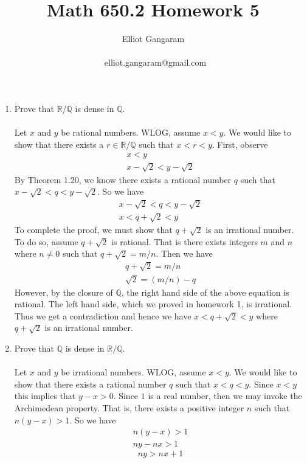 \documentclass[12pt]{article}
\title{Math 650.2 Homework 5}
\author{Elliot Gangaram\\
\date{}
\ elliot.gangaram@gmail.com \\}
\begin{document}
\maketitle

\problem 
\begin{enumerate}
\item Prove that $\mathbb{R}$/$\mathbb{Q}$ is dense in $\mathbb{Q}$. \\ \\
Let $x$ and $y$ be rational numbers. WLOG, assume $x<y$. We would like to show that there exists a $r \in \mathbb{R}$/$\mathbb{Q}$ such that $x<r<y$. First, observe 
\begin{align*}
x<y \\
x - \sqrt{2} < y -\sqrt{2}
\end{align*}
By Theorem 1.20, we know there exists a rational number $q$ such that $x - \sqrt{2} < q< y -\sqrt{2}$. So we have
\begin{align*}
x - \sqrt{2} < q< y -\sqrt{2} \\
x < q + \sqrt{2} < y 
\end{align*}
To complete the proof, we must show that $q + \sqrt{2} $ is an irrational number. To do so, assume $q + \sqrt{2}$ is rational. That is there exists integers $m$ and $n$ where $n \neq 0$ such that $q + \sqrt{2} = m/n$. Then we have 
\begin{align*}
q + \sqrt{2} = m/n \\
\sqrt{2} = (m/n) - q
\end{align*}
However, by the closure of $\mathbb{Q}$, the right hand side of the above equation is rational. The left hand side, which we proved in homework 1, is irrational. Thus we get a contradiction and hence we have $x < q + \sqrt{2} < y$ where $ q + \sqrt{2}$ is an irrational number. 
\item Prove that $\mathbb{Q}$ is dense in $\mathbb{R}/\mathbb{Q}$. \\ \\ 
Let $x$ and $y$ be irrational numbers. WLOG, assume $x<y$. We would like to show that there exists a rational number $q$ such that $x<q<y$. Since $x<y$ this implies that $y-x>0$. Since $1$ is a real number, then we may invoke the Archimedean property. That is, there exists a positive integer $n$ such that $n(y-x)>1$. So we have
\begin{align*}
n(y-x)>1 \\
ny-nx>1
\end{align*} \begin{equation}
ny>nx+1
\end{equation}

\end{enumerate}
\end{document}
